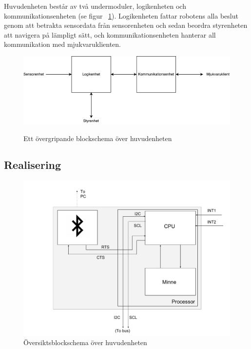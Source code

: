 \documentclass{article}
\begin{document}
Huvudenheten består av två undermoduler, logikenheten och kommunikationsenheten (se figur ~\ref{fig:huvudenhet}). Logikenheten fattar robotens alla beslut genom att betrakta sensordata från sensorenheten och sedan beordra styrenheten att navigera på lämpligt sätt, och kommunikationsenheten hanterar all kommunikation med mjukvaruklienten. 

\begin{figure}[H]
  \centering
  \includegraphics[scale=0.5]{Huvudenhet} \\
  \caption{Ett övergripande blockschema över huvudenheten}
  \label{fig:huvudenhet}
\end{figure}

\subsection{Realisering}

\begin{figure}[H]
 \centering
 \includegraphics[scale=0.40]{Huvudmodul_oversikt_blockschema}
 \caption{Översiktsblockschema över huvudenheten}
 \label{fig:Huvudmodul_oversikt_blockschema}
\end{figure}
\end{document}
